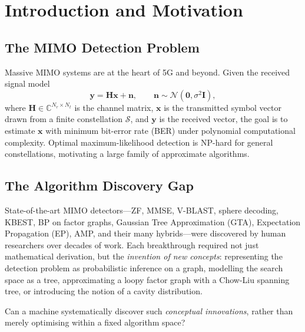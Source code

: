 \documentclass[12pt,a4paper]{article}
\newcommand{\bH}{\mathbf{H}}
\newcommand{\bx}{\mathbf{x}}
\newcommand{\by}{\mathbf{y}}
\newcommand{\bn}{\mathbf{n}}
\newcommand{\bI}{\mathbf{I}}
\newcommand{\calN}{\mathcal{N}}
\newcommand{\calS}{\mathcal{S}}
\begin{document}
\tableofcontents
\newpage
{}

\section{Introduction and Motivation}
\label{sec:intro}

\subsection{The MIMO Detection Problem}

Massive MIMO systems are at the heart of 5G and beyond.  Given the received
signal model
\begin{equation}
  \by = \bH\bx + \bn, \qquad
  \bn \sim \calN(\mathbf{0}, \sigma^2\bI),
  \label{eq:mimo}
\end{equation}
where $\bH\in\mathbb{C}^{N_r\times N_t}$ is the channel matrix, $\bx$ is the
transmitted symbol vector drawn from a finite constellation $\calS$, and $\by$
is the received vector, the goal is to estimate $\bx$ with minimum bit-error
rate (BER) under polynomial computational complexity.  Optimal
maximum-likelihood detection is NP-hard for general constellations, motivating a
large family of approximate algorithms.

\subsection{The Algorithm Discovery Gap}

State-of-the-art MIMO detectors---ZF, MMSE, V-BLAST, sphere decoding, KBEST,
BP on factor graphs, Gaussian Tree Approximation (GTA), Expectation Propagation
(EP), AMP, and their many hybrids---were discovered by human researchers over
decades of work.  Each breakthrough required not just mathematical derivation,
but the \emph{invention of new concepts}: representing the detection problem as
probabilistic inference on a graph, modelling the search space as a tree,
approximating a loopy factor graph with a Chow-Liu spanning tree, or introducing
the notion of a cavity distribution.

\begin{tcolorbox}[challenge, title={Core Challenge}]
  Can a machine systematically discover such \emph{conceptual innovations},
  rather than merely optimising within a fixed algorithm space?
\end{tcolorbox}
\end{document}
